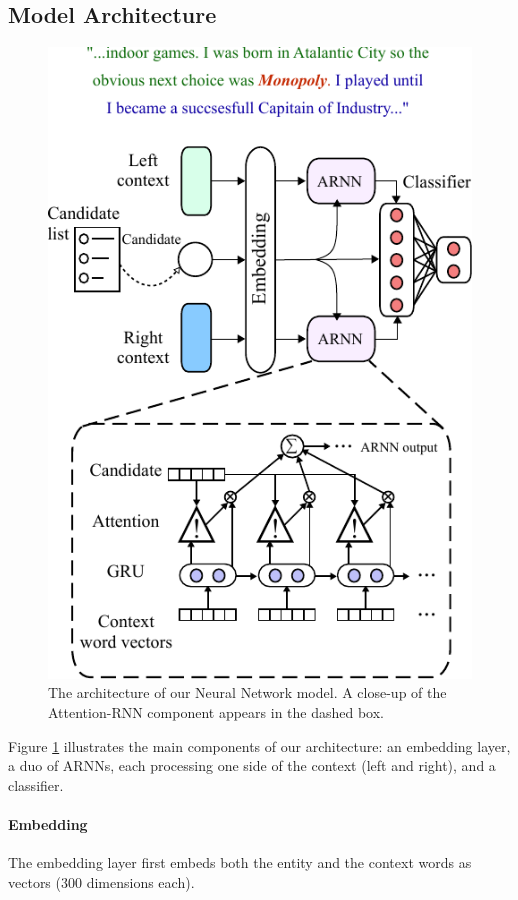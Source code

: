 \documentclass[11pt,letterpaper]{article}
\begin{document}
	\subsection{Model Architecture}
	
	\begin{figure}[t]
		\centering
		\includegraphics[scale=0.92]{diagrams/model_color_v7.pdf}
		\caption{The architecture of our Neural Network model. A close-up of the Attention-RNN component appears in the dashed box.}
		\label{fig:arnn}
	\end{figure}	
	
	Figure \ref{fig:arnn} illustrates the main components of our architecture: an embedding layer, a duo of ARNNs, each processing one side of the context (left and right), %
	and a classifier. 
	
	
	\paragraph{Embedding}
	The embedding layer first embeds both the entity and the context words as vectors (300 dimensions each).
	
\end{document}
